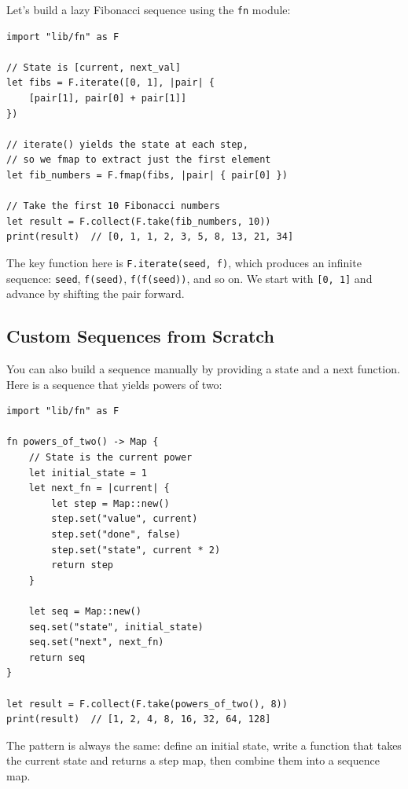 Let's build a lazy Fibonacci sequence using the \lstinline|fn| module:

\begin{lstlisting}[language=Lattice, caption={A custom Fibonacci iterator}]
import "lib/fn" as F

// State is [current, next_val]
let fibs = F.iterate([0, 1], |pair| {
    [pair[1], pair[0] + pair[1]]
})

// iterate() yields the state at each step,
// so we fmap to extract just the first element
let fib_numbers = F.fmap(fibs, |pair| { pair[0] })

// Take the first 10 Fibonacci numbers
let result = F.collect(F.take(fib_numbers, 10))
print(result)  // [0, 1, 1, 2, 3, 5, 8, 13, 21, 34]
\end{lstlisting}

The key function here is \lstinline|F.iterate(seed, f)|, which produces an infinite sequence: \lstinline|seed|, \lstinline|f(seed)|, \lstinline|f(f(seed))|, and so on.
We start with \lstinline|[0, 1]| and advance by shifting the pair forward.

\subsection{Custom Sequences from Scratch}\label{subsec:custom-from-scratch}

You can also build a sequence manually by providing a state and a next function.
Here is a sequence that yields powers of two:

\begin{lstlisting}[language=Lattice, caption={Building a sequence from scratch}]
import "lib/fn" as F

fn powers_of_two() -> Map {
    // State is the current power
    let initial_state = 1
    let next_fn = |current| {
        let step = Map::new()
        step.set("value", current)
        step.set("done", false)
        step.set("state", current * 2)
        return step
    }

    let seq = Map::new()
    seq.set("state", initial_state)
    seq.set("next", next_fn)
    return seq
}

let result = F.collect(F.take(powers_of_two(), 8))
print(result)  // [1, 2, 4, 8, 16, 32, 64, 128]
\end{lstlisting}

The pattern is always the same: define an initial state, write a function that takes the current state and returns a step map, then combine them into a sequence map.


